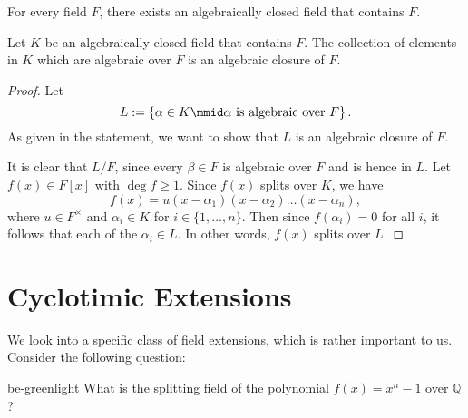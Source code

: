 \documentclass[notoc,notitlepage]{tufte-book}
\begin{document}
\begin{thm}\label{thm:every_field_has_an_algebraic_closure}
  For every field $F$, there exists an algebraically closed field that contains $F$.
\end{thm}

\begin{thm}\label{thm:smallest_algebraic_closure}
  Let $K$ be an algebraically closed field that contains $F$. The collection of elements
  in $K$ which are algebraic over $F$ is an algebraic closure of $F$.
\end{thm}

\begin{proof}
  Let
  \begin{equation*}
    L := \left\{ \alpha \in K \mmid \alpha \text{ is algebraic over } F \right\}.
  \end{equation*}
  As given in the statement, we want to show that $L$ is an algebraic closure of $F$.

  It is clear that $L / F$, since every $\beta \in F$ is algebraic over $F$ and is hence
  in $L$. Let $f(x) \in F[x]$ with $\deg f \geq 1$. Since $f(x)$ splits over $K$, we have
  \begin{equation*}
    f(x) = u(x - \alpha_1)(x - \alpha_2) \hdots (x - \alpha_n),
  \end{equation*}
  where $u \in F^\times$ and $\alpha_i \in K$ for $i \in \{ 1, \ldots, n \}$. Then since
  $f(\alpha_i) = 0$ for all $i$, it follows that each of the $\alpha_i \in L$. In other
  words, $f(x)$ splits over $L$.
\end{proof}


\section{Cyclotimic Extensions}%
\label{sec:cyclotimic_extensions}

We look into a specific class of field extensions, which is rather important to us.
Consider the following question:

\begin{quotebox}{be-green}{light}
  What is the splitting field of the polynomial $f(x) = x^n - 1$ over $\mathbb{Q}$?
\end{quotebox}
\end{document}
